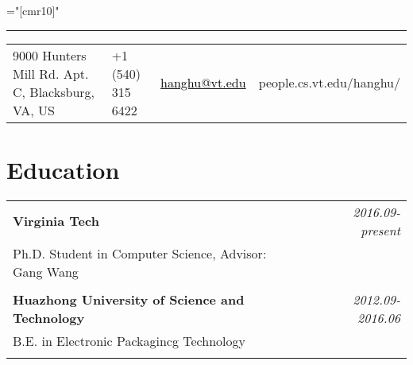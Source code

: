 \documentclass[a4paper,10pt]{article}
\begin{document}
\pagestyle{empty} %

\font\fb="[cmr10]" %
\bigskip

\hrule height 0.7mm \vspace{-0.4em}
\begin{tabular}{p{7.0cm}p{2.8cm}p{3.0cm}p{3.0cm}}
 {\small 9000 Hunters Mill Rd. Apt. C, Blacksburg, VA, US}
&  {\small +1 (540) 315 6422}
& {\small \href{mailto:hanghu@vt.edu}{\textcolor{black}{hanghu@vt.edu}}}
&{\small people.cs.vt.edu/hanghu/}
   \\
\end{tabular}


\section{Education}
\begin{tabular}{p{13.5cm}p{0.5cm}r}

\textbf{Virginia Tech} && \emph{2016.09-present} \\
\hspace{1em} Ph.D. Student in Computer Science, Advisor: Gang Wang && \vspace{-0.5em} \\
\multicolumn{3}{c}{} \\

\textbf{Huazhong University of Science and Technology} && \emph{2012.09-2016.06} \\
\hspace{1em} B.E. in Electronic Packagincg Technology && \vspace{-0.5em} \\

\multicolumn{3}{c}{} \\
\end{tabular}
\end{document}
